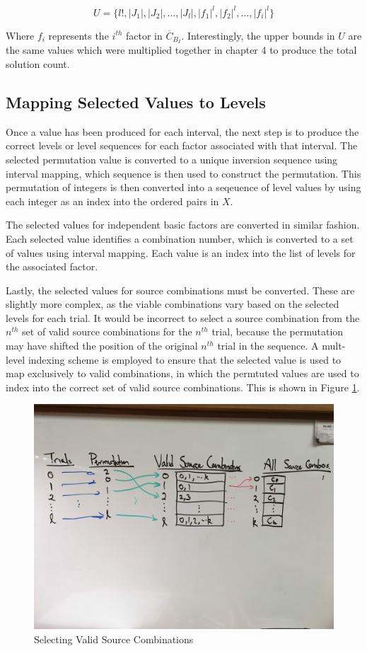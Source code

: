 \[
U = \{ l!, |J_1|, |J_2|, ..., |J_l|, |f_1|^l, |f_2|^l, ..., |f_i|^l\}
\]

Where $f_i$ represents the $i^{th}$ factor in $\overline{C}_{B_I}$. Interestingly, the upper bounds in $U$ are the same values which were multiplied together in chapter 4 to produce the total solution count.

\subsection{Mapping Selected Values to Levels}

Once a value has been produced for each interval, the next step is to produce the correct levels or level sequences for each factor associated with that interval. The selected permutation value is converted to a unique inversion sequence using interval mapping, which sequence is then used to construct the permutation. This permutation of integers is then converted into a seqeuence of level values by using each integer as an index into the ordered pairs in $X$.

The selected values for independent basic factors are converted in similar fashion. Each selected value identifies a combination number, which is converted to a set of values using interval mapping. Each value is an index into the list of levels for the associated factor.

Lastly, the selected values for source combinations must be converted. These are slightly more complex, as the viable combinations vary based on the selected levels for each trial. It would be incorrect to select a source combination from the $n^{th}$ set of valid source combinations for the $n^{th}$ trial, because the permutation may have shifted the position of the original $n^{th}$ trial in the sequence. A mult-level indexing scheme is employed to ensure that the selected value is used to map exclusively to valid combinations, in which the permtuted values are used to index into the correct set of valid source combinations. This is shown in Figure \ref{fig:source_combinations}.

\begin{figure}[htb]
\centering
\centerline{\includegraphics[origin=c,width=12cm]{../figures/source-combinations.jpg}}
\caption{Selecting Valid Source Combinations}
\label{fig:source_combinations}
\end{figure}

